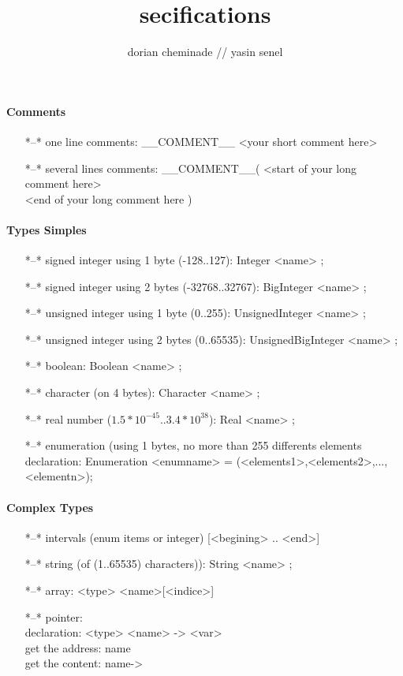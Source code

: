 \documentclass[10pt,a4paper,final]{report}
\author{dorian cheminade // yasin senel}
\title{secifications}
\begin{document}
\tableofcontents

\paragraph{Comments}
\begin{itemize}
\item[*--*]one line comments: \_\_COMMENT\_\_ <your short comment here>
\item[*--*]several lines comments: \_\_COMMENT\_\_( <start of your long comment here>\\<end of your long comment here )
\end{itemize}

\paragraph{Types Simples}
\begin{itemize}
\item[*--*]signed integer using 1 byte (-128..127): Integer <name> ;
\item[*--*]signed integer using 2 bytes (-32768..32767): BigInteger <name> ;
\item[*--*]unsigned integer using 1 byte (0..255): UnsignedInteger <name> ;
\item[*--*]unsigned integer using 2 bytes (0..65535): UnsignedBigInteger <name> ;
\item[*--*]boolean: Boolean <name> ;
\item[*--*]character (on 4 bytes): Character <name> ;
\item[*--*]real number ($1.5*10^{-45}..3.4*10^{38}$): Real <name> ;
\item[*--*]enumeration (using 1 bytes, no more than 255 differents elements 
	\\declaration: Enumeration <enumname> = (<elements1>,<elements2>,...,<elementn>);
	
\end{itemize}

\paragraph{Complex Types}
\begin{itemize}
\item[*--*]intervals (enum items or integer)  [<begining> .. <end>]
\item[*--*]string (of (1..65535) characters)): String <name> ;
\item[*--*]array: <type> <name>[<indice>]
\item[*--*]pointer: 
	\\declaration: <type> <name> -> <var>
	\\get the address: name
	\\get the content: name->
\end{itemize}
\end{document}

